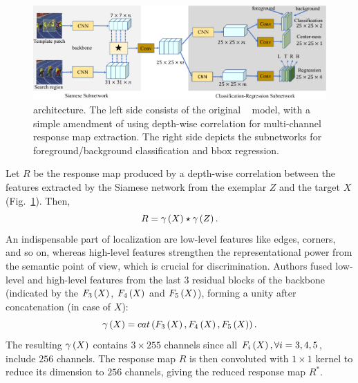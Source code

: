 \begin{figure}[t]
    \centerline{\includegraphics[width=\linewidth]{figures/theoretical_foundations/siamcar_architecture.pdf}}
    \caption[ architecture]{ architecture. The left side consists of the original ~\cite{Bertinetto2016} model, with a simple amendment of using depth-wise correlation for multi-channel response map extraction. The right side depicts the subnetworks for foreground/background classification and \gls{bbox} regression. }
    \label{fig:SiamCARArchitecture}
\end{figure}

Let $R$ be the response map produced by a depth-wise correlation between the features extracted by the Siamese network from the exemplar $Z$ and the target $X$ (Fig.~\ref{fig:SiamCARArchitecture}). Then,
\begin{equation}
    R = {\gamma} \left( X \right) \star {\gamma} \left( Z \right).
\end{equation}
An indispensable part of localization are low-level features like edges, corners, and so on, whereas high-level features strengthen the representational power from the semantic point of view, which is crucial for discrimination. Authors fused low-level and high-level features from the last $3$ residual blocks of the  backbone (indicated by the ${F_3} \left( X \right)$, ${F_4} \left( X \right)$ and ${F_5} \left( X \right)$), forming a unity after concatenation (in case of $X$):
\begin{equation}
    {\gamma} \left( X \right) = {cat} \left( {F_3} \left( X \right), {F_4} \left( X \right), {F_5} \left( X \right) \right).
\end{equation}
The resulting ${\gamma} \left( X \right)$ contains $3 \times 255$ channels since all ${F_i} \left( X \right), \forall i = 3, 4, 5$, include $256$ channels. The response map $R$ is then convoluted with $1 \times 1$ kernel to reduce its dimension to $256$ channels, giving the reduced response map $R^*$.

